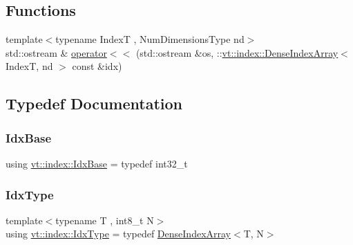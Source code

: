 \subsection*{Functions}
\begin{DoxyCompactItemize}
\item 
{\footnotesize template$<$typename IndexT , Num\+Dimensions\+Type nd$>$ }\\std\+::ostream \& \hyperlink{namespacevt_1_1index_a5bf333293029702c6e66c1faee749df8}{operator$<$$<$} (std\+::ostream \&os, \+::\hyperlink{structvt_1_1index_1_1_dense_index_array}{vt\+::index\+::\+Dense\+Index\+Array}$<$ IndexT, nd $>$ const \&idx)
\end{DoxyCompactItemize}


\subsection{Typedef Documentation}
\mbox{\label{namespacevt_1_1index_a0dbb8d47463da27c1436e8e4ddb02743}} 
\subsubsection{\texorpdfstring{Idx\+Base}{IdxBase}}
{\footnotesize\ttfamily using \hyperlink{namespacevt_1_1index_a0dbb8d47463da27c1436e8e4ddb02743}{vt\+::index\+::\+Idx\+Base} = typedef int32\+\_\+t}

\mbox{\label{namespacevt_1_1index_a939bace7aba6cd4a76b2c12a138c5991}} 
\subsubsection{\texorpdfstring{Idx\+Type}{IdxType}}
{\footnotesize\ttfamily template$<$typename T , int8\+\_\+t N$>$ \\
using \hyperlink{namespacevt_1_1index_a939bace7aba6cd4a76b2c12a138c5991}{vt\+::index\+::\+Idx\+Type} = typedef \hyperlink{structvt_1_1index_1_1_dense_index_array}{Dense\+Index\+Array}$<$T, N$>$}

\mbox{\label{namespacevt_1_1index_a091a4f5a7a2c993d9727eaa60cf67d81}} 
